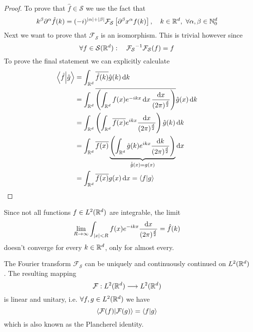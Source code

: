 \documentclass[../../script.tex]{subfiles}
\begin{document}
\begin{proof}
    To prove that $\hat{f} \in \mathcal{S}$ we use the fact that 
    \begin{equation}
        k^{\beta} \partial^{\alpha} \hat{f}(k) = (-i)^{\abs{\alpha} + \abs{\beta}} \mathcal{F}_{\mathcal{S}} \left[ \partial^{\beta} x^{\alpha} f(k) \right], \quad k \in \mathbb{R}^d, ~\forall \alpha, \beta \in \mathbb{N}_0^d
    \end{equation}
    Next we want to prove that $\mathcal{F}_{\mathcal{S}}$ is an isomorphism. This is trivial however since 
    \begin{equation}
        \forall f \in \mathcal{S}(\mathbb{R}^d): \quad {\mathcal{F}_{\mathcal{S}}}^{-1}\mathcal{F}_{\mathcal{S}}(f) = f
    \end{equation}
    To prove the final statement we can explicitly calculate 
    \begin{equation}
        \begin{split}
            \innerproduct{\hat{f}}{\hat{g}} &= \int_{\realn^d} \conj{\hat{f}(k)} \hat{g}(k) \dd{k} \\
            &= \int_{\realn^d} \conj{\left( \int_{\realn^d} f(x) e^{-ikx} \dd{x} \frac{\dd{x}}{(2\pi)^{\frac{d}{2}}} \right)} \hat{g}(x) \dd{k} \\
            &= \int_{\realn^d} \left( \int_{\realn^d} \conj{f(x)} e^{ikx} \frac{\dd{x}}{(2\pi)^{\frac{d}{2}}} \right) \hat{g}(k) \dd{k} \\
            &= \int_{\realn^d} \conj{f(x)} \underbrace{\left(\int_{\realn^d} \hat{g}(k) e^{ikx} \frac{\dd{k}}{(2\pi)^{\frac{d}{2}}}\right)}_{\check{\hat{g}}(x) = g(x)} \dd{x} \\
            &= \int_{\realn^d} \conj{f(x)} g(x) \dd{x} = \innerproduct{f}{g}
        \end{split}
    \end{equation}
\end{proof}

\begin{rem}
    Since not all functions $f \in L^2(\mathbb{R}^d)$ are integrable, the limit
    \[
        \lim_{R \rightarrow \infty} \int_{\abs{x} < R} f(x) e^{-ikx} \frac{\dd{x}}{(2\pi)^{\frac{d}{2}}} = \hat{f}(k)
    \]
    doesn't converge for every $k \in \mathbb{R}^d$, only for almost every.
\end{rem}

\begin{thm}
    The Fourier transform $\mathcal{F}_{\mathcal{S}}$ can be uniquely and continuously continued on $L^2(\mathbb{R}^d)$. The resulting mapping
    \[
        \mathcal{F}: L^2(\mathbb{R}^d) \longrightarrow L^2(\mathbb{R}^d)
    \]
    is linear and unitary, i.e. $\forall f, g \in L^2(\mathbb{R}^d)$ we have 
    \[
        \innerproduct{\mathcal{F}(f)}{\mathcal{F}(g)} = \innerproduct{f}{g}
    \]
    which is also known as the Plancherel identity.
\end{thm}
\end{document}
